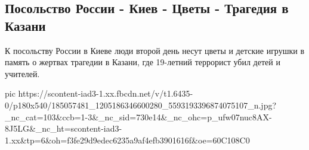  
 
 
 
 

\subsection{Посольство России - Киев - Цветы - Трагедия в Казани}
\label{sec:12_05_2021.fb.berdnik_miroslava.1.kazan_maj_cvety_kiev_posolstvo}

К посольству России в Киеве люди второй день несут цветы и детские игрушки в
память о жертвах трагедии в Казани, где 19-летний террорист убил детей и
учителей.


\ifcmt
  pic https://scontent-iad3-1.xx.fbcdn.net/v/t1.6435-0/p180x540/185057481_1205186346600280_5593193396874075107_n.jpg?_nc_cat=103&ccb=1-3&_nc_sid=730e14&_nc_ohc=p_ufw07nuc8AX-8J5LG&_nc_ht=scontent-iad3-1.xx&tp=6&oh=f3fe29d9edec6235a9af4efb3901616f&oe=60C108C0
\fi

